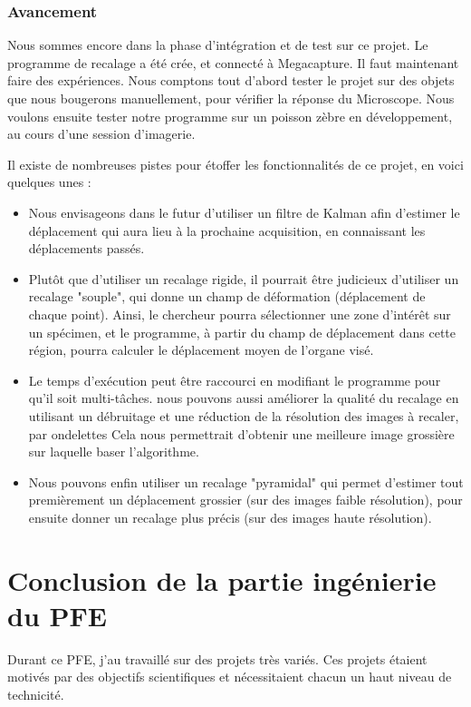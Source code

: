 \subsubsection{Avancement}

Nous sommes encore dans la phase d'intégration et de test sur ce projet.
Le programme de recalage a été crée, et connecté à Megacapture.
Il faut maintenant faire des expériences. Nous comptons tout d'abord tester le projet
sur des objets que nous bougerons manuellement, pour vérifier la réponse du Microscope.
Nous voulons ensuite tester notre programme sur un poisson zèbre en développement, au cours d'une session d'imagerie.

Il existe de nombreuses pistes pour étoffer les fonctionnalités de ce projet, en voici quelques unes :
\begin{itemize}
  \item Nous envisageons dans le futur d'utiliser un filtre de Kalman afin d'estimer
  le déplacement qui aura lieu à la prochaine acquisition, en connaissant les déplacements passés.
  \item Plutôt que d'utiliser un recalage rigide, il pourrait être judicieux d'utiliser un recalage "souple",
  qui donne un champ de déformation (déplacement de chaque point).
  Ainsi, le chercheur pourra sélectionner une zone d'intérêt sur un spécimen,
  et le programme, à partir du champ de déplacement dans cette région, pourra calculer
  le déplacement moyen de l'organe visé.
  \item Le temps d'exécution peut être raccourci en modifiant le programme pour qu'il soit multi-tâches.
  nous pouvons aussi améliorer la qualité du recalage en utilisant un débruitage et une réduction de la résolution
  des images à recaler, par ondelettes
  Cela nous permettrait d'obtenir une meilleure image grossière sur laquelle baser l'algorithme.
  \item Nous pouvons enfin utiliser un recalage "pyramidal" qui permet d'estimer tout premièrement un déplacement
  grossier (sur des images faible résolution), pour ensuite donner un recalage plus précis (sur des images haute résolution).
\end{itemize}


\section{Conclusion de la partie ingénierie du PFE}

Durant ce PFE, j'au travaillé sur des projets très variés.
Ces projets étaient motivés par des objectifs scientifiques et nécessitaient chacun un haut niveau de technicité.


